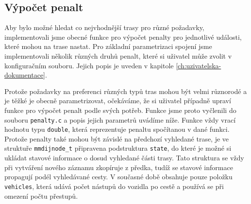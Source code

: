 \subsection{Výpočet penalt}
Aby bylo možné hledat co nejvhodnější trasy pro různé požadavky, implementovali
jsme obecné funkce pro výpočet penalty pro jednotlivé události, které mohou na
trase nastat. Pro základní parametrizaci spojení jsme implementovali několik
různých druhů penalt, které si uživatel může zvolit v konfiguračním souboru.
Jejich popis je uveden v kapitole \ref{ch:uzivatelska-dokumentace}.  

Protože požadavky na preferenci různých typů tras mohou být velmi
různorodé a je těžké je obecně parametrizovat, očekáváme, že si uživatel
případně upraví funkce pro výpočet penalt podle svých potřeb. Funkce jsme proto
vyčlenili do souboru {\tt penalty.c} a popis jejich parametrů uvádíme níže.
Funkce vždy vrací hodnotu typu {\tt double}, která reprezentuje penaltu
spočítanou v dané funkci. Protože penalty také mohou být závislé na předchozí
vyhledané trase, je ve struktuře {\tt mmdijnode\_t} připravena podstruktura
{\tt state}, do které je možné si ukládat stavové informace o dosud vyhledané
části trasy. Tato struktura se vždy při vytváření nového záznamu zkopíruje z
předka, tudíž se stavové informace propagují podél vyhledávané cesty. V současné
době obsahuje pouze položku {\tt vehicles}, která udává počet nástupů do vozidla
po cestě a používá se při omezení počtu přestupů. 

